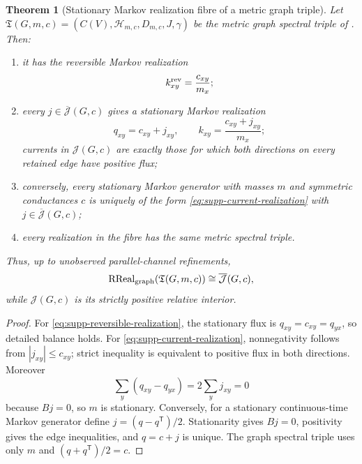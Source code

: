 \documentclass[11pt]{article}
\newtheorem{theorem}{Theorem}[section]
\theoremstyle{definition}
\theoremstyle{remark}
\theoremstyle{definition}
\theoremstyle{remark}
\newcommand{\Hh}{\mathcal H}
\newcommand{\RReal}{\operatorname{RReal}}
\begin{document}
\begin{theorem}[Stationary Markov realization fibre of a metric graph triple]
\label{thm:supp-graph-realization}
Let
$\mathfrak T(G,m,c)=(C(V),\Hh_{m,c},D_{m,c},J,\gamma)$ be the metric graph
spectral triple of .  Then:
\begin{enumerate}[label=\textup{(R\arabic*)},leftmargin=3em]
\item it has the reversible Markov realization
      \begin{equation}
      k_{xy}^{\rm rev}=\frac{c_{xy}}{m_x};
      \label{eq:supp-reversible-realization}
      \end{equation}
\item every $j\in\overline{\mathcal J}(G,c)$ gives a stationary Markov realization
      \begin{equation}
      q_{xy}=c_{xy}+j_{xy},
      \qquad
      k_{xy}=\frac{c_{xy}+j_{xy}}{m_x};
      \label{eq:supp-current-realization}
      \end{equation}
      currents in $\mathcal J(G,c)$ are exactly those for which both directions on
      every retained edge have positive flux;
\item conversely, every stationary Markov generator with masses $m$ and
      symmetric conductances $c$ is uniquely of the form
      \eqref{eq:supp-current-realization} with
      $j\in\overline{\mathcal J}(G,c)$;
\item every realization in the fibre has the same metric spectral triple.
\end{enumerate}
Thus, up to unobserved parallel-channel refinements,
\begin{equation}
 {
 \RReal_{\rm graph}(\mathfrak T(G,m,c))
 \cong\overline{\mathcal J}(G,c),}
 \label{eq:supp-realization-fibre}
\end{equation}
while $\mathcal J(G,c)$ is its strictly positive relative interior.
\end{theorem}

\begin{proof}
For \eqref{eq:supp-reversible-realization}, the stationary flux is
$q_{xy}=c_{xy}=q_{yx}$, so detailed balance holds.  For
\eqref{eq:supp-current-realization}, nonnegativity follows from
$|j_{xy}|\le c_{xy}$; strict inequality is equivalent to positive flux in both
directions.  Moreover
\[
 \sum_y(q_{xy}-q_{yx})=2\sum_yj_{xy}=0
\]
because $Bj=0$, so $m$ is stationary.  Conversely, for a stationary continuous-time Markov
generator define $j=(q-q^{\mathsf T})/2$.  Stationarity gives $Bj=0$, positivity gives
the edge inequalities, and $q=c+j$ is unique.  The graph spectral triple uses
only $m$ and $(q+q^{\mathsf T})/2=c$.
\end{proof}
\end{document}
